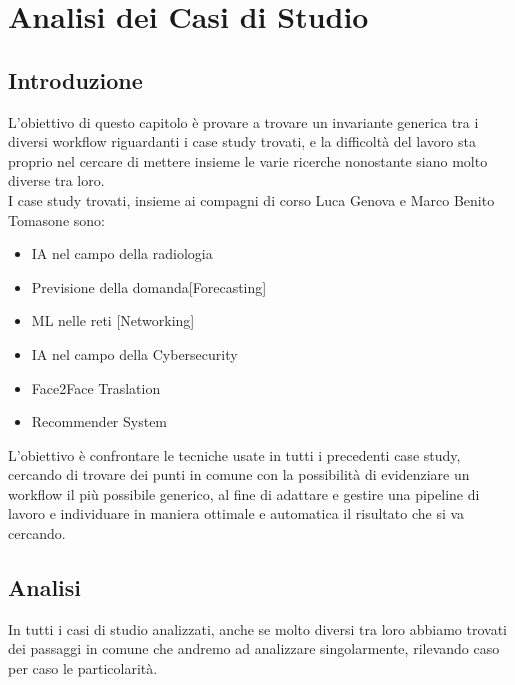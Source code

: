 \documentclass[../tesi.tex]{subfiles}
\begin{document}
\chapter{Analisi dei Casi di Studio}
\section{Introduzione}
L’obiettivo di questo capitolo è provare a trovare un invariante generica tra i diversi workflow riguardanti i case study trovati, e la difficoltà del lavoro sta proprio nel cercare di mettere insieme le varie ricerche nonostante siano molto diverse tra loro.\\
I case study trovati, insieme ai compagni di corso Luca Genova e Marco Benito Tomasone sono:
\begin{itemize}
  \item IA nel campo della radiologia
  \item	Previsione della domanda[Forecasting]
  \item ML nelle reti [Networking]
  \item	IA nel campo della Cybersecurity
  \item Face2Face Traslation
  \item	Recommender System 
\end{itemize}
L’obiettivo è confrontare le tecniche usate in tutti i precedenti case study, cercando di trovare dei punti in comune con la possibilità di evidenziare un workflow il più possibile generico, al fine di adattare e gestire una \Gls{pipeline} di lavoro e individuare in maniera ottimale e automatica il risultato che si va cercando.

\section{Analisi}
In tutti i casi di studio analizzati, anche se molto diversi tra loro abbiamo trovati dei passaggi in comune che andremo ad analizzare singolarmente, rilevando caso per caso le particolarità.
\end{document}
